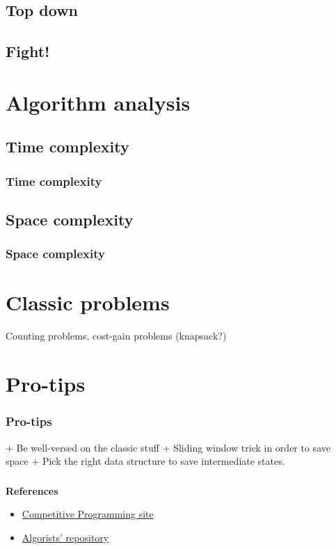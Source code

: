 \documentclass[article]{beamer}
\begin{document}
\subsection{Top down}

\subsection{Fight!}

\section{Algorithm analysis}

\subsection{Time complexity}
\begin{frame}
	\frametitle{Time complexity}
\end{frame}

\subsection{Space complexity}
\begin{frame}
	\frametitle{Space complexity}
\end{frame}

\section{Classic problems}
\begin{frame}
	Counting problems, cost-gain problems (knapsack?)
\end{frame}

\section{Pro-tips}
\begin{frame}
	\frametitle{Pro-tips}
	+ Be well-versed on the classic stuff
	+ Sliding window trick in order to save space
	+ Pick the right data structure to save intermediate states.
\end{frame}

\begin{frame}[plain]
\frametitle{}
\begin{center}
\Huge{\color{blue}{Q \& A}}
\end{center}
\end{frame}

\begin{frame}[plain]
	\textbf{References}
	\begin{itemize}
		\item \href{https://sites.google.com/site/stevenhalim/}{Competitive Programming site}
		\item \href{https://github.com/davidjacobo/algorists/}{Algorists' repository}
	\end{itemize}
\end{frame}
\end{document}
